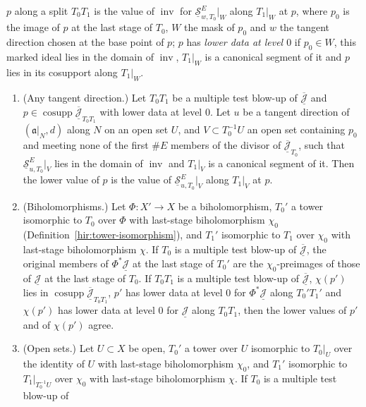 \begin{theorem}
\(p\) along a split \(T_0T_1\) is the value of \(\operatorname{inv}\) for \(\underline{\mathcal S}^E_{w,T_0}|_W\) along \(T_1|_W\) at \(p\), where \(p_0\) is the image of \(p\) at
the last stage of \(T_0\), \(W\) the mask of \(p_0\) and \(w\) the tangent direction chosen at the base point of \(p\); \(p\) has \emph{lower data at level \(0\)} if
\(p_0\in W\), this marked ideal lies in the domain of \(\operatorname{inv}\), \(T_1|_W\) is a canonical segment of it and \(p\) lies in its cosupport along \(T_1|_W\).
\begin{enumerate}
\item (Any tangent direction.) Let \(T_0T_1\) be a multiple test blow-up of \(\overline{\underline{\mathcal J}}\) and \(p\in\operatorname{cosupp}\overline{\underline{\mathcal J}}_{T_0T_1}\)
with lower data at level \(0\). Let \(u\) be a tangent direction of \((\mathfrak a|_N,d)\) along \(N\) on an open set \(U\), and \(V\subset T_0^{-1}U\) an open set containing
\(p_0\) and meeting none of the first \(\#E\) members of the divisor of \(\overline{\underline{\mathcal J}}_{T_0}\), such that \(\underline{\mathcal S}^E_{u,T_0}|_V\) lies in the
domain of \(\operatorname{inv}\) and \(T_1|_V\) is a canonical segment of it. Then the lower value of \(p\) is the value of \(\underline{\mathcal S}^E_{u,T_0}|_V\) along
\(T_1|_V\) at \(p\).
\item (Biholomorphisms.) Let \(\Phi\colon X'\to X\) be a biholomorphism, \(T_0'\) a tower isomorphic to \(T_0\) over \(\Phi\) with last-stage biholomorphism \(\chi_0\)
(Definition~\ref{hir:tower-isomorphism}), and \(T_1'\) isomorphic to \(T_1\) over \(\chi_0\) with last-stage biholomorphism \(\chi\). If \(T_0\) is a multiple test blow-up of
\(\overline{\underline{\mathcal J}}\), the original members of \(\Phi^*\underline{\mathcal J}\) at the last stage of \(T_0'\) are the \(\chi_0\)-preimages of those of
\(\underline{\mathcal J}\) at the last stage of \(T_0\). If \(T_0T_1\) is a multiple test blow-up of \(\overline{\underline{\mathcal J}}\), \(\chi(p')\) lies in
\(\operatorname{cosupp}\overline{\underline{\mathcal J}}_{T_0T_1}\), \(p'\) has lower data at level \(0\) for \(\Phi^*\underline{\mathcal J}\) along \(T_0'T_1'\) and \(\chi(p')\)
has lower data at level \(0\) for \(\underline{\mathcal J}\) along \(T_0T_1\), then the lower values of \(p'\) and of \(\chi(p')\) agree.
\item (Open sets.) Let \(U\subset X\) be open, \(T_0'\) a tower over \(U\) isomorphic to \(T_0|_U\) over the identity of \(U\) with last-stage biholomorphism
\(\chi_0\), and \(T_1'\) isomorphic to \(T_1|_{T_0^{-1}U}\) over \(\chi_0\) with last-stage biholomorphism \(\chi\). If \(T_0\) is a multiple test blow-up of

\end{enumerate}
\end{theorem}
